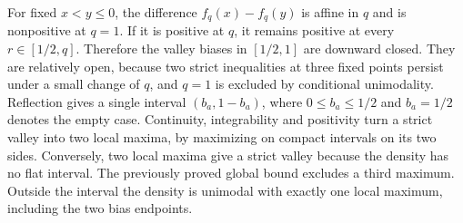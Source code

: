 For fixed $x<y\le0$, the difference $f_q(x)-f_q(y)$ is affine in $q$
and is nonpositive at $q=1$. If it is positive at $q$, it remains positive
at every $r\in[1/2,q]$. Therefore the valley biases in $[1/2,1]$ are
downward closed. They are relatively open, because two strict inequalities
at three fixed points persist under a small change of $q$, and $q=1$ is
excluded by conditional unimodality. Reflection gives a single interval
$(b_a,1-b_a)$, where $0\le b_a\le1/2$ and $b_a=1/2$ denotes the empty
case. Continuity, integrability and positivity turn a strict valley into
two local maxima, by maximizing on compact intervals on its two sides.
Conversely, two local maxima give a strict valley because the density has
no flat interval. The previously proved global bound excludes a third
maximum. Outside the interval the density is unimodal with exactly one
local maximum, including the two bias endpoints.
